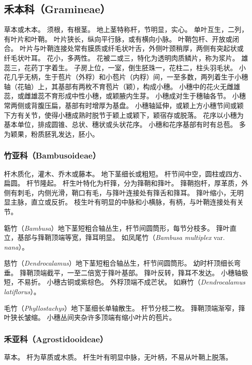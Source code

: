 \documentclass[11pt]{article}
\begin{document}
\begin{sloppypar}
\subsection{禾本科（Gramineae）}
草本或木本。
须根，有根茎。
地上茎特称杆，节明显，实心。
单叶互生，二列，有叶片和叶鞘。
叶片狭长，纵向平行脉，或有横向小脉。
叶鞘包杆、开放或闭合。
叶片与叶鞘连接处常有膜质或纤毛状叶舌，外侧叶颈稍厚，两侧有突起状或纤毛状叶耳。
花小，多两性。
花被二或三，特化为透明肉质鳞片，称为浆片。
雄蕊三，花药丁字着生。
子房上位，一室，倒生胚珠一，花柱二，柱头羽毛状。
小花几乎无柄，生于苞片（外稃）和小苞片（内稃）间，一至多数，两列着生于小穗轴（花轴）上，其基部有两枚不育苞片（颖），构成小穗。
小穗中的花火无雌雄蕊，或雌雄蕊不育形成中性小穗，或颖腋内生芽。
小穗成对生于穗轴各节。
小穗常两侧或背腹压扁，基部有时增厚为基盘。
小穗轴延伸，或颖上方小穗节间或颖下方有关节，使得小穗成熟时脱节于颖上或颖下，颖宿存或脱落。
花序以小穗为基本单位，排成圆锥、总状、穗状或头状花序。
小穗和花序基部有时有总苞。
多为颖果，粉质胚乳发达，胚小。

\subsubsection{竹亚科（Bambusoideae）}
杆木质化，灌木、乔木或藤本。
地下茎细长或粗短。
杆节间中空，圆柱或四方、扁圆。
杆节隆起。
杆生叶特化为杆箨，分为箨鞘和箨叶。
箨鞘抱杆，厚革质，外侧有刺毛，内侧光滑，鞘口有毛，与箨叶连接处有箨舌和箨耳。
箨叶缩小，无明显主脉，直立或反折。
枝生叶有明显的中脉和小横脉，有柄，与叶鞘连接处有关节。

\par

簕竹（\textit{Bambusa}）地下茎短粗合轴丛生，杆节间圆筒形，每节分枝多。
箨叶直立，基部与箨鞘顶端等宽，箨耳明显。
如凤尾竹（\textit{Bambusa multiplex} var. \textit{nana}）。

\par

慈竹（\textit{Dendrocalamus}）地下茎短粗合轴丛生，杆节间圆筒形。
幼时杆顶细长弯垂。
箨鞘顶端截平，一至二倍宽于箨叶基部。
箨叶反转，箨耳不发达。
小穗轴极短，不易折。
小穗古铜或紫棕色。
外稃顶端不成芒状。
如麻竹（\textit{Dendrocalamus latiflorus}）。

\par

毛竹（\textit{Phyllostachys}）地下茎细长单轴散生。
杆节分枝二枚。
箨鞘顶端渐窄，箨叶狭长皱缩。
小穗丛间夹杂许多顶端有缩小叶片的苞片。

\subsubsection{禾亚科（Agrostidooideae）}
草本。
杆为草质或木质。
杆生叶有明显中脉，无叶柄，不易从叶鞘上脱落。


\end{sloppypar}
\end{document}
